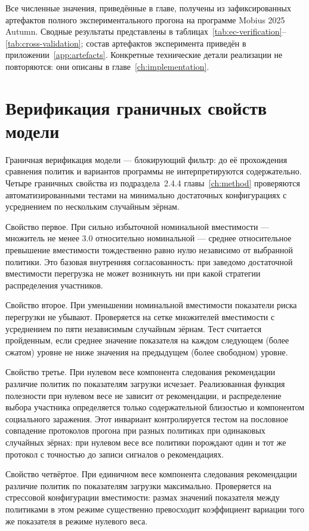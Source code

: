 Все численные значения, приведённые в главе, получены из зафиксированных артефактов полного экспериментального прогона на программе Mobius 2025 Autumn. Сводные результаты представлены в таблицах~\ref{tab:ec-verification}--\ref{tab:cross-validation}; состав артефактов эксперимента приведён в приложении~\ref{app:artefacts}. Конкретные технические детали реализации не повторяются: они описаны в главе~\ref{ch:implementation}.


\section{Верификация граничных свойств модели}
\label{sec:4-2}

Граничная верификация модели --- блокирующий фильтр: до её прохождения сравнения политик и вариантов программы не интерпретируются содержательно. Четыре граничных свойства из подраздела~2.4.4 главы~\ref{ch:method} проверяются автоматизированными тестами на минимально достаточных конфигурациях с усреднением по нескольким случайным зёрнам.

Свойство первое. При сильно избыточной номинальной вместимости --- множитель не менее 3.0 относительно номинальной --- среднее относительное превышение вместимости тождественно равно нулю независимо от выбранной политики. Это базовая внутренняя согласованность: при заведомо достаточной вместимости перегрузка не может возникнуть ни при какой стратегии распределения участников.

Свойство второе. При уменьшении номинальной вместимости показатели риска перегрузки не убывают. Проверяется на сетке множителей вместимости с усреднением по пяти независимым случайным зёрнам. Тест считается пройденным, если среднее значение показателя на каждом следующем (более сжатом) уровне не ниже значения на предыдущем (более свободном) уровне.

Свойство третье. При нулевом весе компонента следования рекомендации различие политик по показателям загрузки исчезает. Реализованная функция полезности при нулевом весе не зависит от рекомендации, и распределение выбора участника определяется только содержательной близостью и компонентом социального заражения. Этот инвариант контролируется тестом на пословное совпадение протоколов прогона при разных политиках при одинаковых случайных зёрнах: при нулевом весе все политики порождают один и тот же протокол с точностью до записи сигналов о рекомендациях.

Свойство четвёртое. При единичном весе компонента следования рекомендации различие политик по показателям загрузки максимально. Проверяется на стрессовой конфигурации вместимости: размах значений показателя между политиками в этом режиме существенно превосходит коэффициент вариации того же показателя в режиме нулевого веса.

